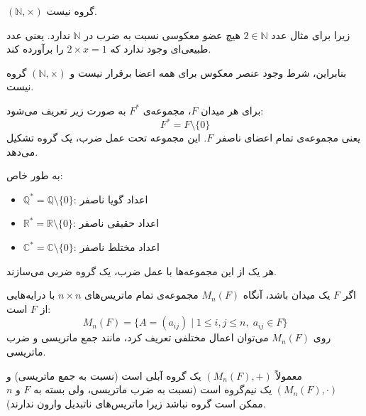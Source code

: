 \begin{frame}
    \begin{example}
        \( (\mathbb{N}, \times) \) گروه نیست.

        زیرا برای مثال عدد \( 2 \in \mathbb{N} \) هیچ عضو معکوسی نسبت به ضرب در \( \mathbb{N} \) ندارد.
        یعنی عدد طبیعی‌ای وجود ندارد که \( 2 \times x = 1 \) را برآورده کند.

        بنابراین، شرط وجود عنصر معکوس برای همه اعضا برقرار نیست و \( (\mathbb{N}, \times) \) گروه نیست.
    \end{example}


\end{frame}

\begin{frame}
    \begin{definition}
        برای هر میدان \( F \)، مجموعه‌ی \( F^* \) به صورت زیر تعریف می‌شود:
        \[
            F^* = F \setminus \{0\}
        \]
        یعنی مجموعه‌ی تمام اعضای ناصفر \( F \). این مجموعه تحت عمل ضرب، یک گروه تشکیل می‌دهد.

        به طور خاص:
        \begin{itemize}
            \item \( \mathbb{Q}^* = \mathbb{Q} \setminus \{0\} \): اعداد گویا ناصفر
            \item \( \mathbb{R}^* = \mathbb{R} \setminus \{0\} \): اعداد حقیقی ناصفر
            \item \( \mathbb{C}^* = \mathbb{C} \setminus \{0\} \): اعداد مختلط ناصفر
        \end{itemize}
        هر یک از این مجموعه‌ها با عمل ضرب، یک گروه ضربی می‌سازند.
    \end{definition}
\end{frame}

\begin{frame}
    \begin{definition}
        اگر \( F \) یک میدان  باشد، آنگاه \( M_n(F) \) مجموعه‌ی تمام ماتریس‌های \( n \times n \) با درایه‌هایی از \( F \) است:
        \[
            M_n(F) = \{ A = (a_{ij}) \mid 1 \leq i, j \leq n,\; a_{ij} \in F \}
        \]
        روی \( M_n(F) \) می‌توان اعمال مختلفی تعریف کرد، مانند جمع ماتریسی و ضرب ماتریسی.

        معمولاً \( (M_n(F), +) \) یک گروه آبلی است (نسبت به جمع ماتریسی) و \( (M_n(F), \cdot) \) یک نیم‌گروه است (نسبت به ضرب ماتریسی، ولی بسته به \( F \) و \( n \) ممکن است گروه نباشد زیرا ماتریس‌های ناتبدیل وارون ندارند).
    \end{definition}


\end{frame}

